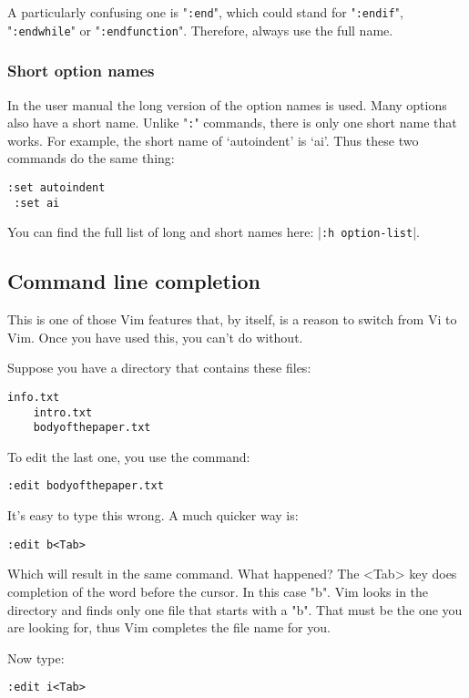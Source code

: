 A particularly confusing one is "\verb!:end!", which could stand for "\verb!:endif!", "\verb!:endwhile!" or "\verb!:endfunction!".
Therefore, always use the full name.
\subsubsection{Short option names}
In the user manual the long version of the option names is used.
Many options also have a short name.
Unlike "\verb!:!" commands, there is only one short name that works.
For example, the short name of `autoindent' is `ai'.
Thus these two commands do the same thing:

\begin{Verbatim}[samepage=true]
 :set autoindent
 :set ai
\end{Verbatim}

You can find the full list of long and short names here: |\verb!:h option-list!|.
\subsection{Command line completion}
This is one of those Vim features that, by itself, is a reason to switch from Vi to Vim.
Once you have used this, you can't do without.

Suppose you have a directory that contains these files:

\begin{Verbatim}[samepage=true]
    info.txt
    intro.txt
    bodyofthepaper.txt
\end{Verbatim}

To edit the last one, you use the command:

\begin{Verbatim}[samepage=true]
 :edit bodyofthepaper.txt
\end{Verbatim}

It's easy to type this wrong.
A much quicker way is:

\begin{Verbatim}[samepage=true]
 :edit b<Tab>
\end{Verbatim}

Which will result in the same command.
What happened?
The <Tab> key does completion of the word before the cursor.
In this case "b".
Vim looks in the directory and finds only one file that starts with a "b".
That must be the one you are looking for, thus Vim completes the file name for you.

Now type:

\begin{Verbatim}[samepage=true]
 :edit i<Tab>
\end{Verbatim}

